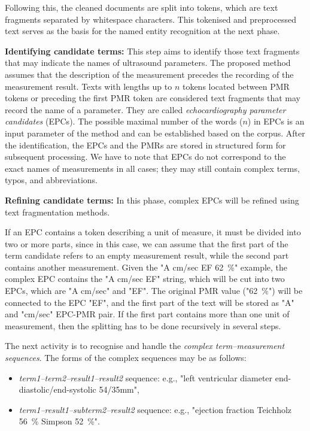Following this, the cleaned documents are split into tokens, which are text fragments separated by whitespace characters. This tokenised and preprocessed text serves as the basis for the named entity recognition at the next phase.

\textbf{Identifying candidate terms:} This step aims to identify those text fragments that may indicate the names of ultrasound parameters. The proposed method assumes that the description of the measurement precedes the recording of the measurement result. Texts with lengths up to $n$ tokens located between PMR tokens or preceding the first PMR token are considered text fragments that may record the name of a parameter. They are called \textit{echocardiography parameter candidates} (EPCs). The possible maximal number of the words ($n$) in EPCs is an input parameter of the method and can be established based on the corpus. After the identification, the EPCs and the PMRs are stored in structured form for subsequent processing. We have to note that EPCs do not correspond to the exact names of measurements in all cases; they may still contain complex terms, typos, and abbreviations. 

\textbf{Refining candidate terms:} In this phase, complex EPCs will be refined using text fragmentation methods. 

If an EPC contains a token describing a unit of measure, it must be divided into two or more parts, since in this case, we can assume that the first part of the term candidate refers to an empty measurement result, while the second part contains another measurement. Given the "A cm/sec EF \SI{62}{\percent}" example, the complex EPC contains the "A cm/sec EF" string, which will be cut into two EPCs, which are "A cm/sec" and "EF". The original PMR value ("\SI{62}{\percent}") will be connected to the EPC "EF", and the first part of the text will be stored as "A" and "cm/sec" EPC-PMR pair. If the first part contains more than one unit of measurement, then the splitting has to be done recursively in several steps.

The next activity is to recognise and handle the \textit{complex term–measurement sequences}. The forms of the complex sequences may be as follows:

\begin{itemize}
	\item \textit{term1–term2–result1–result2} sequence: e.g., "left ventricular diameter end-diastolic/end-systolic 54/35mm",
	\item \textit{term1–result1–subterm2–result2} sequence: e.g., "ejection fraction Teichholz \SI{56}{\percent} Simpson \SI{52}{\percent}".
\end{itemize}


